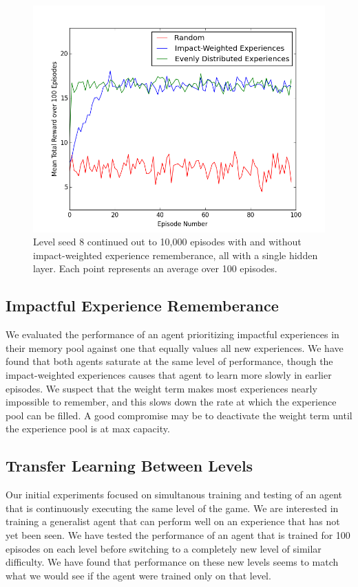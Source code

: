 \documentclass{article}
\begin{document}
 \begin{figure}
 \begin{center}
 \includegraphics[scale=0.42]{10000epsSeed8.png}
\caption{Level seed 8 continued out to 10,000 episodes with and without impact-weighted experience rememberance, all with a single hidden layer. Each point represents an average over 100 episodes.}
 \end{center}
 \end{figure}
 
 \subsection{Impactful Experience Rememberance}
 We evaluated the performance of an agent prioritizing impactful experiences in their memory pool against one that equally values all new experiences. We have found that both agents saturate at the same level of performance, though the impact-weighted experiences causes that agent to learn more slowly in earlier episodes. We suspect that the weight term makes most experiences nearly impossible to remember, and this slows down the rate at which the experience pool can be filled. A good compromise may be to deactivate the weight term until the experience pool is at max capacity.
 
 \subsection{Transfer Learning Between Levels}
 
 Our initial experiments focused on simultanous training and testing of an agent that is continuously executing the same level of the game. We are interested in training a generalist agent that can perform well on an experience that has not yet been seen. We have tested the performance of an agent that is trained for 100 episodes on each level before switching to a completely new level of similar difficulty. We have found that performance on these new levels seems to match what we would see if the agent were trained only on that level.
 
\end{document}
